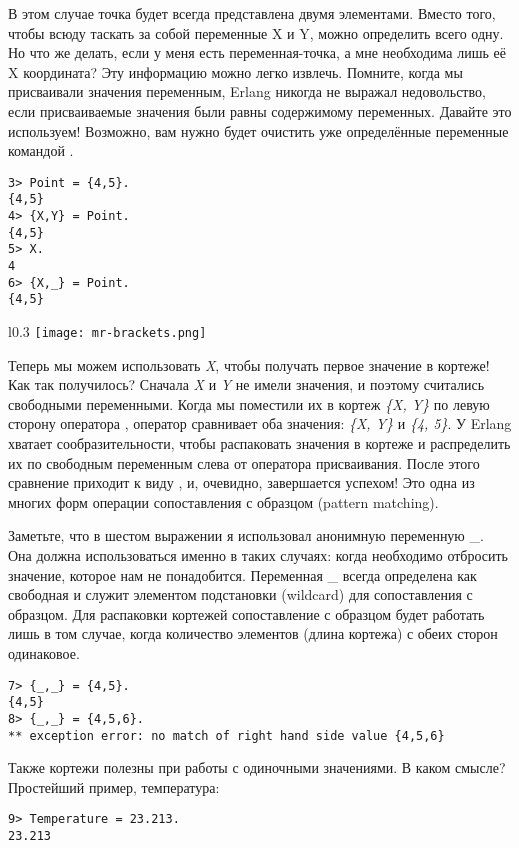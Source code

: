 В этом случае точка будет всегда представлена двумя элементами.
Вместо того, чтобы всюду таскать за собой переменные X и Y, можно определить всего одну.
Но что же делать, если у меня есть переменная\--точка, а мне необходима лишь её X координата?
Эту информацию можно легко извлечь.
Помните, когда мы присваивали значения переменным, Erlang никогда не выражал недовольство, если присваиваемые значения были равны содержимому переменных.
Давайте это используем!
Возможно, вам нужно будет очистить уже определённые переменные командой .
\begin{lstlisting}[style=repl]
3> Point = {4,5}.
{4,5}
4> {X,Y} = Point.
{4,5}
5> X.
4
6> {X,_} = Point.
{4,5}
\end{lstlisting}
\begin{wrapfigure}{l}{0.3\textwidth}
    \texttt{[image: mr-brackets.png]}
\end{wrapfigure}

Теперь мы можем использовать \emph{X}, чтобы получать первое значение в кортеже!
Как так получилось?
Сначала \emph{X} и \emph{Y} не имели значения, и поэтому считались свободными переменными.
Когда мы поместили их в кортеж \emph{\{X, Y\}} по левую сторону оператора \ops{=}, оператор \ops{=} сравнивает оба значения: \emph{\{X, Y\}} и \emph{\{4, 5\}}.
У Erlang хватает сообразительности, чтобы распаковать значения в кортеже и распределить их по свободным переменным слева от оператора присваивания.
После этого сравнение приходит к виду , и, очевидно, завершается успехом!
Это одна из многих форм операции сопоставления с образцом (pattern matching).

Заметьте, что в шестом выражении я использовал анонимную переменную \_.
Она должна использоваться именно в таких случаях: когда необходимо отбросить значение, которое нам не понадобится.
Переменная \_ всегда определена как свободная и служит элементом подстановки (wildcard) для сопоставления с образцом.
Для распаковки кортежей сопоставление с образцом будет работать лишь в том случае, когда количество элементов (длина кортежа) с обеих сторон одинаковое.
\begin{lstlisting}[style=repl]
7> {_,_} = {4,5}.
{4,5}
8> {_,_} = {4,5,6}.
** exception error: no match of right hand side value {4,5,6}
\end{lstlisting}

Также кортежи полезны при работы с одиночными значениями.
В каком смысле?
Простейший пример, температура:
\begin{lstlisting}[style=repl]
9> Temperature = 23.213.
23.213
\end{lstlisting}

